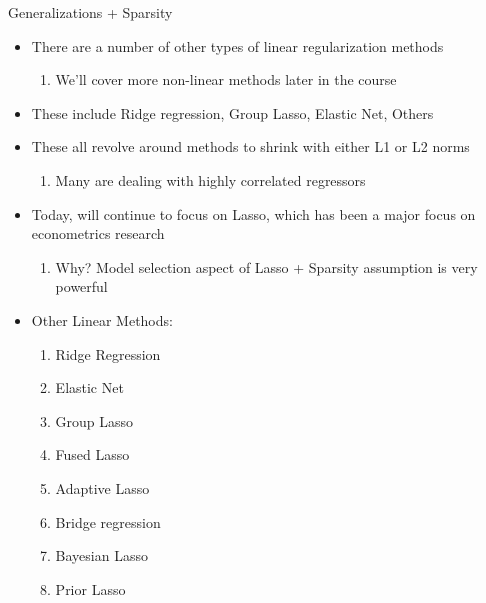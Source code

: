   \begin{frame}[allowframebreaks]{Generalizations + Sparsity}
    \begin{itemize}
        \item There are a number of other types of linear regularization methods
          \begin{enumerate}[-]
          \item We'll cover more non-linear methods later in the course
          \end{enumerate}
        \item These include Ridge regression, Group Lasso, Elastic Net, Others
        \item These all revolve around methods to shrink with either L1 or
          L2 norms
          \begin{enumerate}[-]
          \item Many are dealing with highly correlated regressors
          \end{enumerate}
        \item Today, will continue to focus on Lasso, which has been a major
          focus on econometrics research
          \begin{enumerate}[-]
          \item Why? Model selection aspect of Lasso + Sparsity assumption is very powerful
          \end{enumerate}
        \end{itemize}

        \framebreak

        \begin{itemize}
            \item Other Linear Methods:
      \begin{enumerate}[-]
      \item Ridge Regression
      \item Elastic Net
      \item Group Lasso
      \item Fused Lasso
      \item Adaptive Lasso
      \item Bridge regression
      \item Bayesian Lasso
        \item Prior Lasso
        \end{enumerate}
      \end{itemize}
     
  \end{frame}

